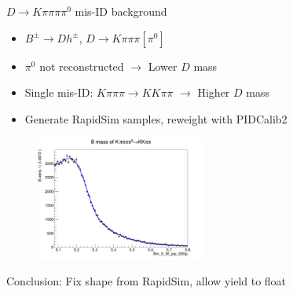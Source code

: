\documentclass{beamer}
\begin{document}
\begin{frame}{$D\to K\pi\pi\pi\pi^0$ mis-ID background}
  \begin{itemize}
    \setlength\itemsep{0.5em}
    \item{$B^\pm\to Dh^\pm$, $D\to K\pi\pi\pi[\pi^0]$}
    \item{$\pi^0$ not reconstructed $\to$ Lower $D$ mass}
    \item{Single mis-ID: $K\pi\pi\pi\to KK\pi\pi$ $\to$ Higher $D$ mass}
    \item{Generate RapidSim samples, reweight with PIDCalib2}
  \end{itemize}
  \begin{figure}
    \includegraphics[width = 0.5\textwidth]{Plots/Kpipipipi0BMassB2DpiD2Kpipipi.png}
  \end{figure}
  \begin{center}
    Conclusion: Fix shape from RapidSim, allow yield to float
  \end{center}
\end{frame}
\end{document}
